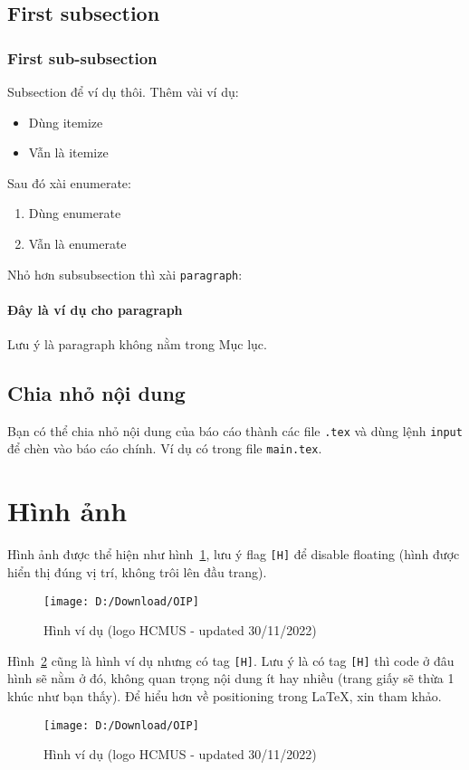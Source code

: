 \documentclass[a4paper,14pt]{article}
\begin{document}
	\subsection{First subsection}
	\subsubsection{First sub-subsection}
	Subsection để ví dụ thôi. Thêm vài ví dụ:
	\begin{itemize}
		\item Dùng itemize
		\item Vẫn là itemize
	\end{itemize}
	Sau đó xài enumerate:
	\begin{enumerate}
		\item Dùng enumerate
		\item Vẫn là enumerate
	\end{enumerate}
	Nhỏ hơn subsubsection thì xài \texttt{paragraph}:
	
	\paragraph{Đây là ví dụ cho paragraph}
	Lưu ý là paragraph không nằm trong Mục lục.
	
	\subsection{Chia nhỏ nội dung}
	Bạn có thể chia nhỏ nội dung của báo cáo thành các file \texttt{.tex} và dùng lệnh \texttt{input} để chèn vào báo cáo chính. Ví dụ có trong file \texttt{main.tex}.

	\section{Hình ảnh}
	Hình ảnh được thể hiện như hình~\ref{fig:oip}, lưu ý flag \texttt{[H]} để disable floating (hình được hiển thị đúng vị trí, không trôi lên đầu trang).
	\begin{figure}%
		\centering
		\texttt{[image: D:/Download/OIP]}
		\caption{Hình ví dụ (logo HCMUS - updated 30/11/2022)}
		\label{fig:oip}
	\end{figure}
	Hình~\ref{fig:oip_with_h} cũng là hình ví dụ nhưng có tag \texttt{[H]}. Lưu ý là có tag \texttt{[H]} thì code ở đâu hình sẽ nằm ở đó, không quan trọng nội dung ít hay nhiều (trang giấy sẽ thừa 1 khúc như bạn thấy). Để hiểu hơn về positioning trong LaTeX, xin tham khảo.
	\begin{figure}[h]
		\centering
		\texttt{[image: D:/Download/OIP]}
		\caption{Hình ví dụ (logo HCMUS - updated 30/11/2022)}
		\label{fig:oip_with_h}
	\end{figure}
\end{document}
